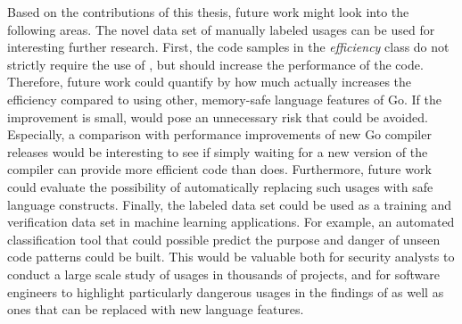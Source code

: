 Based on the contributions of this thesis, future work might look into the following areas.
The novel data set of manually labeled \unsafe{} usages can be used for interesting further research.
First, the code samples in the \textit{efficiency} class do not strictly require the use of \unsafe{}, but should increase the
performance of the code.
Therefore, future work could quantify by how much \unsafe{} actually increases the efficiency compared to using other,
memory-safe language features of Go.
If the improvement is small, \unsafe{} would pose an unnecessary risk that could be avoided.
Especially, a comparison with performance improvements of new Go compiler releases would be interesting to see if
simply waiting for a new version of the compiler can provide more efficient code than \unsafe{} does.
Furthermore, future work could evaluate the possibility of automatically replacing such \unsafe{} usages with safe
language constructs.
Finally, the labeled data set could be used as a training and verification data set in machine learning applications.
For example, an automated classification tool that could possible predict the purpose and danger of unseen \unsafe{}
code patterns could be built.
This would be valuable both for security analysts to conduct a large scale study of \unsafe{} usages in thousands of
projects, and for software engineers to highlight particularly dangerous usages in the findings of \toolGeiger{} as well
as ones that can be replaced with new language features.


